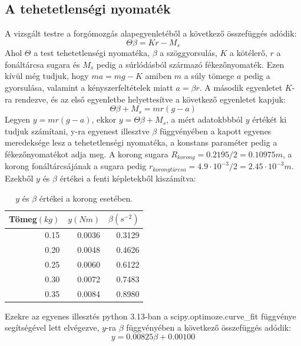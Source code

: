 \documentclass[10pt,pdftex]{report}
\begin{document}
\subsection*{A tehetetlenségi nyomaték}
A vizsgált testre a forgómozgás alapegyenletéből a következő összefüggés adódik:
\begin{equation*}
    \Theta\beta=Kr-M_s
\end{equation*}
Ahol $\Theta$ a test tehetetlenségi nyomatéka, $\beta$ a szöggyorsulás, $K$ a kötélerő, $r$ a fonáltárcsa sugara és $M_s$ pedig a súrlódásból származó fékezőnyomaték. Ezen kívül még tudjuk, hogy $ma=mg-K$ amiben $m$ a súly tömege $a$ pedig a gyorsulása, valamint a kényszerfeltételek miatt $a=\beta r$. A második egyenletet $K$-ra rendezve, és az első egyenletbe helyettesítve a következő egyenletet kapjuk:
\begin{equation*}
    \Theta\beta+M_s=mr\left(g-a\right)
\end{equation*}
Legyen $y=mr\left(g-a\right)$, ekkor $y=\Theta\beta+M_s$, a mért adatokbbból $y$ értékét ki tudjuk számítani, y-ra egyenest illesztve $\beta$ függvényében a kapott egyenes meredeksége lesz a tehetetlenségi nyomatéka, a konstans paraméter pedig a fékezőnyomatékot adja meg.\newline
A korong sugara $R_{korong}=0.2195/2=0.10975m$, a korong fonáltárcsájának a sugara pedig $r_{korong tárcsa}=4.9\cdot 10^{-3}/2=2.45\cdot 10^{-3}m$. Ezekből $y$ és $\beta$ értékei a fenti képletekből kiszámítva:
\begin{table}[H]
    \centering
    \begin{tabular}{|r|r|r|}
        \hline
        Tömeg$(kg)$ & $y(Nm)$ & $\beta(s^{-2})$ \\
        \hline
        0.15 & 0.0036 & 0.3129 \\
        \hline
        0.20 & 0.0048 & 0.4626 \\
        \hline
        0.25 & 0.0060 & 0.6122 \\
        \hline
        0.30 & 0.0072 & 0.7483 \\
        \hline
        0.35 & 0.0084 & 0.8980 \\
        \hline
    \end{tabular}
    \caption{$y$ és $\beta$ értékei a korong esetében.}
\end{table}
Ezekre az egyenes illesztés python 3.13-ban a scipy.optimoze.curve\_fit függvénye segítségével lett elvégezve, $y$-ra $\beta$ függvényében a következő összefüggés adódik:
\begin{equation*}
    y=0.00825\beta+0.00100
\end{equation*}
\end{document}

